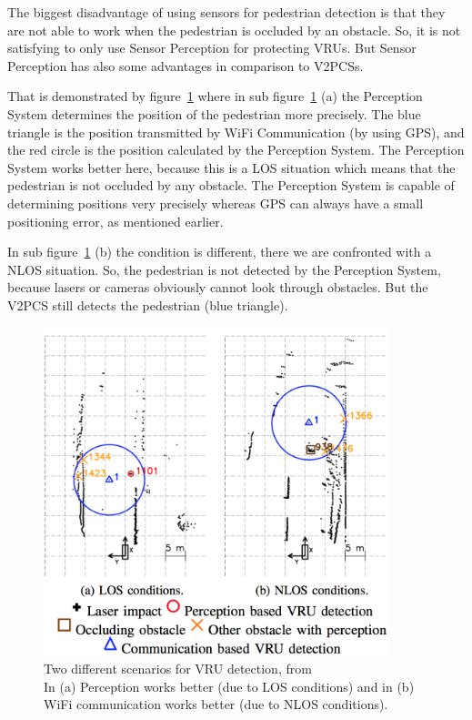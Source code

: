 \documentclass[]{ccs-thesis}
\begin{document}
The biggest disadvantage of using sensors for pedestrian detection is that they are not able to work when the pedestrian is occluded by an obstacle. So, it is not satisfying to only use Sensor Perception for protecting \acp{VRU}. But Sensor Perception has also some advantages in comparison to \acp{V2PCS}. 

That is demonstrated by figure~\ref{fig:fusion} where in sub figure~\ref{fig:fusion} (a) the Perception System determines the position of the pedestrian more precisely. The blue triangle is the position transmitted by WiFi Communication (by using GPS), and the red circle is the position calculated by the Perception System. The Perception System works better here, because this is a \ac{LOS} situation which means that the pedestrian is not occluded by any obstacle. The Perception System is capable of determining positions very precisely whereas GPS can always have a small positioning error, as mentioned earlier.

In sub figure~\ref{fig:fusion} (b) the condition is different, there we are confronted with a \ac{NLOS} situation. So, the pedestrian is not detected by the Perception System, because lasers or cameras obviously cannot look through obstacles. But the \ac{V2PCS} still detects the pedestrian (blue triangle).

\begin{figure}[h]
	\centering
	\includegraphics[width=0.9\textwidth]{figures/7_fusion}
	\caption{Two different scenarios for \ac{VRU} detection, from \cite{2016fusion}\\ In (a) Perception works better (due to \ac{LOS} conditions) and in (b) WiFi communication works better (due to \ac{NLOS} conditions).}%
	\label{fig:fusion}%
\end{figure}
\end{document}
